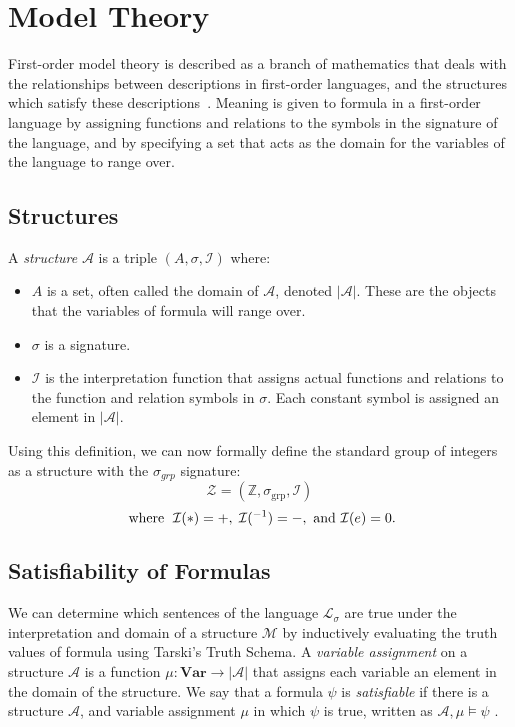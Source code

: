 \documentclass[11pt]{report}
\theoremstyle{definition}
\theoremstyle{theorem}
\theoremstyle{lemma}
\begin{document}
\section{Model Theory}
First-order model theory is described as a branch of mathematics that deals with the relationships between descriptions in first-order languages, and the structures which satisfy these descriptions~\cite{stanmodel}.
Meaning is given to formula in a first-order language by assigning functions and relations to the symbols in the signature of the language, and by specifying a set that acts as the domain for the variables of the language to range over.

\subsection{Structures}\label{def:structures}
A \emph{structure} \cite[ch.~2.1]{selinger} $\mathcal{A}$ is a triple $(A, \sigma,\mathcal{I})$ where:
\begin{itemize}
  \item $A$ is a set, often called the domain of $\mathcal{A}$, denoted $|\mathcal{A}|$. These are the objects that the variables of formula will range over. 
  \item $\sigma$ is a signature.
  \item $\mathcal I$ is the interpretation function that assigns actual functions and relations to the function and relation symbols in $\sigma$. Each constant symbol is  assigned an element in $|\mathcal{A}|$.
\end{itemize}
Using this definition, we can now formally define the standard group of integers as a structure with the $\sigma_{\mathit{grp}}$ signature:
$$\mathcal{Z} = (\mathbb{Z}, \sigma_{\text{grp}}, \mathcal{I})$$
$$\text{ where \hspace{1mm}} \mathcal{I}(*) = +,\hspace{1mm} \mathcal{I}(^{-1}) = -, \text{ and } \mathcal{I}(e) = 0.$$

\subsection{Satisfiability of Formulas}
We can determine which sentences of the language $\mathcal{L_\sigma}$ are true under the interpretation and domain of a structure $\mathcal{M}$ by inductively evaluating the truth values of formula using Tarski's Truth Schema\cite{tarski}.
A \emph{variable assignment} on a structure $\mathcal{A}$ is a function $\mu: \textbf{Var} \rightarrow |\mathcal{A}|$ that assigns each variable an element in the domain of the structure.
We say that a formula $\psi$ is \emph{satisfiable} if there is a structure $\mathcal A$, and variable assignment $\mu$ in which $\psi$ is true, written as $\mathcal{A}, \mu \vDash \psi$ \cite[ch.~2.3]{selinger}.\\
\end{document}
